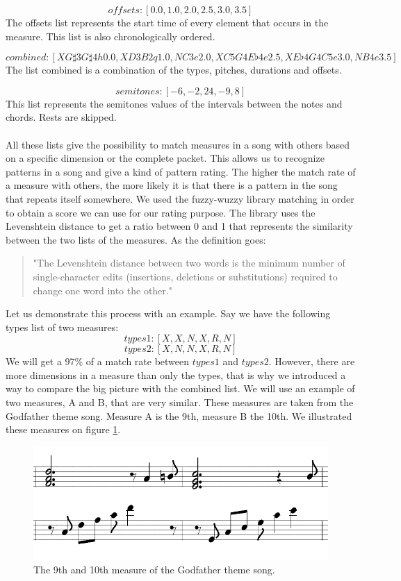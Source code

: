 \documentclass[a4paper]{article}
\begin{document}
\[offsets: [0.0, 1.0, 2.0, 2.5, 3.0, 3.5] \]
The offsets list represents the start time of every element that occurs in the measure. This list is also chronologically ordered.

\[ combined: [XG\sharp3G\sharp4h0.0, XD3B2q1.0, NC3e2.0, XC5G4E\flat4e2.5, XE\flat4G4C5e3.0, NB4e3.5] \]
The list combined is a combination of the types, pitches, durations and offsets.

\[semitones: [-6, -2, 24, -9, 8] \]
This list represents the semitones values of the intervals between the notes and chords. Rests are skipped.
\\\\
All these lists give the possibility to match measures in a song with others based on a specific dimension or the complete packet. This allows us to recognize patterns in a song and give a kind of pattern rating. The higher the match rate of a measure with others, the more likely it is that there is a pattern in the song that repeats itself somewhere. We used the fuzzy-wuzzy library \cite{FuzzyWuzzy} matching in order to obtain a score we can use for our rating purpose. The library uses the Levenshtein distance \cite{Levenshtein_distance} to get a ratio between 0 and 1 that represents the similarity between the two lists of the measures. As the definition goes: 
\begin{quotation}
	"The Levenshtein distance between two words is the minimum number of single-character edits (insertions, deletions or substitutions) required to change one word into the other."
\end{quotation}

Let us demonstrate this process with an example. Say we have the following types list of two measures:
\[ types1: [X, X, N, X, R, N] \]
\[ types2: [X, N, N, X, R, N] \]
We will get a 97\% of a match rate between $types1$ and $types2$. However, there are more dimensions in a measure than only the types, that is why we introduced a way to compare the big picture with the combined list. We will use an example of two measures, A and B, that are very similar. These measures are taken from the Godfather theme song. Measure A is the 9th, measure B the 10th. We illustrated these measures on figure \ref{fig:GF_measures}.

\begin{figure}[H]
	\includegraphics[width=\textwidth]{Fotos/measures/GF_9-10.png}
	\caption{The 9th and 10th measure of the Godfather theme song.}
	\label{fig:GF_measures}
\end{figure}
\end{document}
